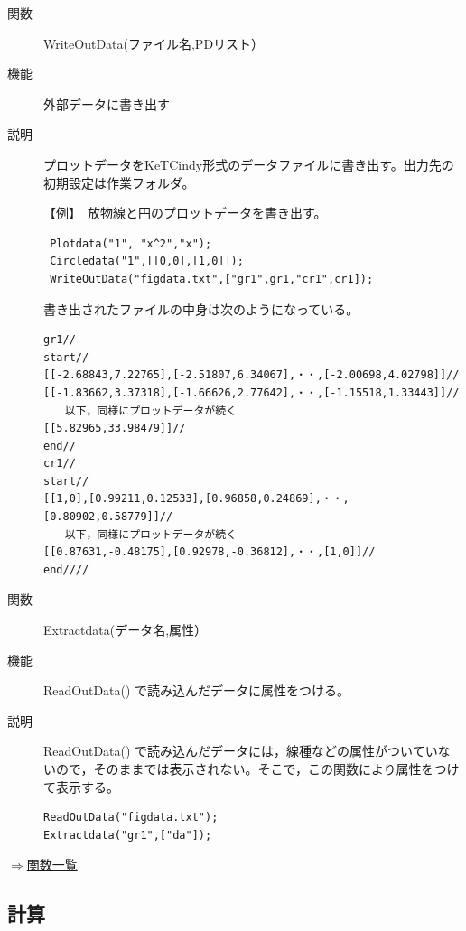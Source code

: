 \documentclass[papersize,a4paper,12pt,uplatex]{jsarticle}
\begin{document}
\begin{description}
\vspace{\baselineskip}
\hypertarget{writeoutdata}{}
\item[関数]WriteOutData(ファイル名,PDリスト）
\item[機能]外部データに書き出す
\item[説明]プロットデータをKeTCindy形式のデータファイルに書き出す。出力先の 初期設定は作業フォルダ。

【例】　放物線と円のプロットデータを書き出す。

\begin{verbatim}
 Plotdata("1", "x^2","x");
 Circledata("1",[[0,0],[1,0]]);
 WriteOutData("figdata.txt",["gr1",gr1,"cr1",cr1]);
\end{verbatim}

書き出されたファイルの中身は次のようになっている。

\begin{verbatim}
gr1// 
start//
[[-2.68843,7.22765],[-2.51807,6.34067],・・,[-2.00698,4.02798]]//
[[-1.83662,3.37318],[-1.66626,2.77642],・・,[-1.15518,1.33443]]//
　　以下，同様にプロットデータが続く
[[5.82965,33.98479]]//
end//
cr1//
start//
[[1,0],[0.99211,0.12533],[0.96858,0.24869],・・,[0.80902,0.58779]]//
　　以下，同様にプロットデータが続く
[[0.87631,-0.48175],[0.92978,-0.36812],・・,[1,0]]//
end////
\end{verbatim}

\vspace{\baselineskip}
\hypertarget{extractdata}{}
\item[関数]Extractdata(データ名,属性）
\item[機能]ReadOutData() で読み込んだデータに属性をつける。
\item[説明]ReadOutData() で読み込んだデータには，線種などの属性がついていないので，そのままでは表示されない。そこで，この関数により属性をつけて表示する。
\begin{verbatim}
ReadOutData("figdata.txt");
Extractdata("gr1",["da"]);
\end{verbatim}

\end{description}
\begin{flushright}\hyperlink{functionlist}{$\Rightarrow$関数一覧}\end{flushright}

\subsection{計算}
\end{document}
